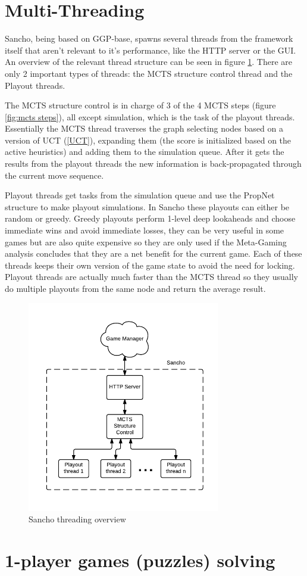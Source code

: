 \section{Multi-Threading}
Sancho, being based on GGP-base, spawns several threads from the framework itself that aren't relevant to it's performance, like the HTTP server or the GUI.
An overview of the relevant thread structure can be seen in figure \ref{fig:sancho_overview}. There are only 2 important types of threads: the MCTS structure control thread and the Playout threads.

The MCTS structure control is in charge of 3 of the 4 MCTS steps (figure \ref{fig:mcts steps}), all except simulation, which is the task of the playout threads.
Essentially the MCTS thread traverses the graph selecting nodes based on a version of UCT (\ref{UCT}), expanding them (the score is initialized based on the active heuristics) and adding them to the simulation queue. After it gets the results from the playout threads the new information is back-propagated through the current move sequence.

Playout threads get tasks from the simulation queue and use the PropNet structure to make playout simulations. In Sancho these playouts can either be random or greedy. Greedy playouts perform 1-level deep lookaheads and choose immediate wins and avoid immediate losses, they can be very useful in some games but are also quite expensive so they are only used if the Meta-Gaming analysis concludes that they are a net benefit for the current game. Each of these threads keeps their own version of the game state to avoid the need for locking. Playout threads are actually much faster than the MCTS thread so they usually do multiple playouts from the same node and return the average result.

\begin{figure}[h]
	\centering
	\includegraphics[width=0.75\textwidth]{images/Sancho_overview.pdf}
	\caption{Sancho threading overview}
	\label{fig:sancho_overview}
\end{figure}

\section{1-player games (puzzles) solving}


